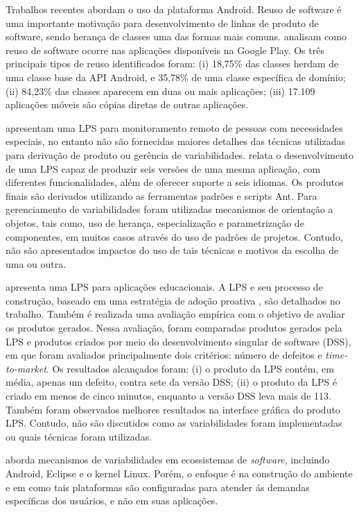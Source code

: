 Trabalhos recentes abordam o uso da plataforma Android. Reuso de software é uma
importante motivação para desenvolvimento de linhas de produto de software, sendo
herança de classes uma das formas mais comuns.  analisam como
reuso de software ocorre nas aplicações disponíveis na Google Play. Os três principais
tipos de reuso identificados foram: (i) 18,75\% das classes herdam de uma classe
base da API Android, e 35,78\% de uma classe específica de domínio; (ii) 84,23\%
das classes aparecem em duas ou mais aplicações; (iii) 17.109 aplicações móveis
são cópias diretas de outras aplicações.

 apresentam uma LPS para monitoramento remoto de pessoas
com necessidades especiais, no entanto não são fornecidas maiores detalhes das
técnicas utilizadas para derivação de produto ou gerência de variabilidades.
\cite{Pavlic2013} relata o desenvolvimento de uma LPS capaz de produzir seis
versões de uma mesma aplicação, com diferentes funcionalidades, além de oferecer
suporte a seis idiomas. Os produtos finais são derivados utilizando as ferramentas
padrões e scripts Ant. Para gerenciamento de variabilidades foram utilizadas
mecanismos de orientação a objetos, tais como, uso de herança, especialização e
parametrização de componentes, em muitos casos através do uso de padrões de projetos.
Contudo, não são apresentados impactos do uso de tais técnicas e motivos da escolha
de uma ou outra.

 apresenta uma LPS para aplicações educacionais.
A LPS e seu processo de construção, baseado em uma estratégia de adoção proativa
\cite{Krueger2002}, são detalhados no trabalho. Também é realizada uma avaliação
empírica com o objetivo de avaliar os produtos gerados. Nessa avaliação, foram
comparadas produtos gerados pela LPS e produtos criados por meio do desenvolvimento
singular de software (DSS), em que foram avaliados principalmente dois critérios:
número de defeitos e \textit{time-to-market}. Os resultados alcançados foram: (i)
o produto da LPS contém, em média, apenas um defeito, contra sete da versão DSS;
(ii) o produto da LPS é criado em menos de cinco minutos, enquanto a versão DSS
leva mais de 113. Também foram observados melhores resultados na interface gráfica
do produto LPS. Contudo, não são discutidos como as variabilidades foram
implementadas ou quais técnicas foram utilizadas.

 aborda mecanismos de variabilidades em ecossistemas de
\textit{software},
incluindo
Android, Eclipse e o kernel Linux. Porém, o enfoque é na construção do ambiente e
em como tais plataformas são configuradas para atender ás demandas específicas
dos usuários, e não em suas aplicações.

